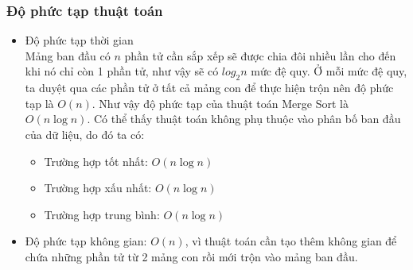 
\subsubsection{Độ phức tạp thuật toán}

\begin{itemize}
    \item Độ phức tạp thời gian \\
    Mảng ban đầu có $n$ phần tử cần sắp xếp sẽ được chia đôi nhiều lần cho đến khi nó chỉ còn 1 phần tử, như vậy sẽ có $log_2{n}$ mức đệ quy. Ở mỗi mức đệ quy, ta duyệt qua các phần tử ở tất cả mảng con để thực hiện trộn nên độ phức tạp là $O\left(n\right)$. Như vậy độ phức tạp của thuật toán Merge Sort là $O\left(n\log{n}\right)$. Có thể thấy thuật toán không phụ thuộc vào phân bố ban đầu của dữ liệu, do đó ta có:
    \begin{itemize}[label=$\circ$]
        \item Trường hợp tốt nhất: $O\left(n\log{n}\right)$
        \item Trường hợp xấu nhất: $O\left(n\log{n}\right)$
        \item Trường hợp trung bình: $O\left(n\log{n}\right)$ 
    \end{itemize}
    
    \item Độ phức tạp không gian: $O\left(n\right)$, vì thuật toán cần tạo thêm không gian để chứa những phần tử từ 2 mảng con rồi mới trộn vào mảng ban đầu.
\end{itemize}